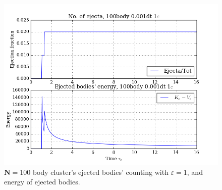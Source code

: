 \documentclass[11pt,a4paper,notitlepage,twocolumn]{article}
\begin{document}
\begin{figure}
[H]\center
\includegraphics[scale=0.35]{../figs/ClusterEnergiesEjecEn_100body_dt1_eps100_dur16.png}
\caption{$\mathbf{N} = 100$ body cluster's ejected bodies' counting with $\varepsilon = 1$, and energy of ejected bodies.}\label{fig:N100eps100ejecEn}
\end{figure}
\end{document}
